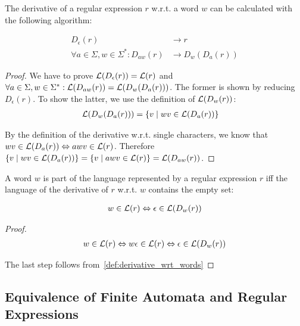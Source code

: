 \begin{theorem}
    The derivative of a regular expression $r$ w.r.t. a word $w$ can be calculated with the following algorithm:

    \begin{align}
        D_\epsilon(r) &\rightarrow r \\
        \forall a \in \Sigma, w \in \Sigma^\ast: D_{a w}(r) &\rightarrow D_w(D_a(r))
    \end{align}
\end{theorem}

\begin{proof}
    We have to prove $\mathcal{L}(D_\epsilon(r)) = \mathcal{L}(r)$ and $\forall a \in \Sigma, w \in \Sigma^\ast: \mathcal{L}(D_{a w}(r)) = \mathcal{L}(D_w(D_a(r)))$.
    The former is shown by reducing $D_\epsilon(r)$.
    To show the latter, we use the definition of $\mathcal{L}(D_w(r))$:
    \begin{align}
        \mathcal{L}(D_w(D_a(r))) &= \{ v \mid w v \in \mathcal{L}(D_a(r)) \}
    \end{align}

    By the definition of the derivative w.r.t. single characters,
    we know that $w v \in \mathcal{L}(D_a(r)) \Leftrightarrow a w v \in \mathcal{L}(r)$.
    Therefore $\{ v \mid w v \in \mathcal{L}(D_a(r)) \} = \{ v \mid a w v \in \mathcal{L}(r) \} = \mathcal{L}(D_{a w}(r))$.
\end{proof}

\begin{theorem}
    A word $w$ is part of the language represented by a regular expression $r$ iff
    the language of the derivative of $r$ w.r.t. $w$ contains the empty set:

    \begin{align}
        w \in \mathcal{L}(r) \Leftrightarrow \epsilon \in \mathcal{L}(D_w(r))
    \end{align}
\end{theorem}

\begin{proof}
    \begin{align}
        w \in \mathcal{L}(r) \Leftrightarrow w \epsilon \in \mathcal{L}(r) \Leftrightarrow \epsilon \in \mathcal{L}(D_w(r))
    \end{align}

    The last step follows from~\ref{def:derivative_wrt_words}
\end{proof}

\subsection{Equivalence of Finite Automata and Regular Expressions}

